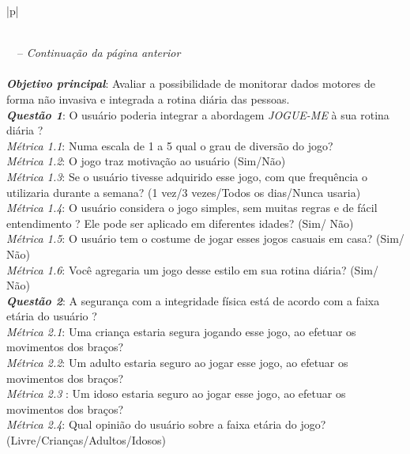 \begin{longtable}{|p{\textwidth}|}
\caption{O Questionário GQM}\\
\hline
\endfirsthead
{}%
{\tablename\ \thetable\ -- \textit{Continuação da página anterior}} \\
\hline
\endhead
\hline {} \\
\endfoot
\hline
\endlastfoot
\textbf{\textit{Objetivo principal}}: Avaliar a possibilidade de monitorar dados motores de forma não invasiva e integrada a rotina diária das pessoas. \\ \hline
\textbf{\textit{Questão 1}}: O usuário poderia integrar a abordagem \textit{JOGUE-ME} à sua rotina diária ?\\ \hline
\textit{Métrica 1.1}: Numa escala de 1 a 5 qual o grau de diversão do jogo? \\ \hline
\textit{Métrica 1.2}: O jogo traz motivação ao usuário (Sim/Não) \\ \hline
\textit{Métrica 1.3}: Se o usuário tivesse adquirido esse jogo, com que frequência o utilizaria durante a semana? (1 vez/3 vezes/Todos os dias/Nunca usaria) \\ \hline
\textit{Métrica 1.4}: O usuário considera o jogo simples, sem muitas regras e de fácil entendimento ? Ele pode ser aplicado em diferentes idades? (Sim/ Não) \\ \hline
\textit{Métrica 1.5}: O usuário tem o costume de jogar esses jogos casuais em casa? (Sim/ Não) \\ \hline
\textit{Métrica 1.6}: Você agregaria um jogo desse estilo em sua rotina diária? (Sim/ Não) \\ \hline
\textbf{\textit{Questão 2}}: A segurança com a integridade física está de acordo com a faixa etária do usuário ? \\ \hline
\textit{Métrica 2.1}: Uma criança estaria segura jogando esse jogo, ao efetuar os movimentos dos braços? \\ \hline
\textit{Métrica 2.2}: Um adulto estaria seguro ao jogar esse jogo, ao efetuar os movimentos dos braços? \\ \hline
\textit{Métrica 2.3	}: Um idoso estaria seguro ao jogar esse jogo, ao efetuar os movimentos dos braços? \\ \hline
\textit{Métrica 2.4}: Qual opinião do usuário sobre a faixa etária do jogo? (Livre/Crianças/Adultos/Idosos)
\label{tab:gqm}
\end{longtable}


